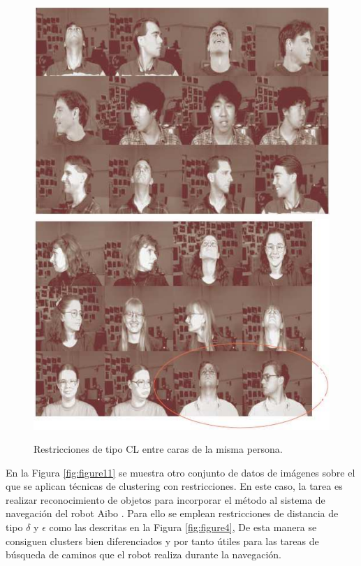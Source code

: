 \begin{figure}[bth]
	\myfloatalign
	{\includegraphics[width=.35\linewidth]{imagenes/c3/AnalisisImagenes/CarasDifOr1}} \quad
	{\includegraphics[width=.35\linewidth]{imagenes/c3/AnalisisImagenes/CarasDifOr2}}
	\caption[Restricciones de tipo \ac{CL} entre caras de la misma persona.]{Restricciones de tipo \ac{CL} entre caras de la misma persona.  \cite{Survey:2007}}\label{fig:figure10}
\end{figure}

En la Figura \ref{fig:figure11} se muestra otro conjunto de datos de imágenes sobre el que se aplican técnicas de clustering con restricciones. En este caso, la tarea es realizar reconocimiento de objetos para incorporar el método al sistema de navegación del robot Aibo \cite{DavidsonRavi:2005a}. Para ello se emplean restricciones de distancia de tipo $\delta$ y $\epsilon$ como las descritas en la Figura \ref{fig:figure4}, De esta manera se consiguen clusters bien diferenciados y por tanto útiles para las tareas de búsqueda de caminos que el robot realiza durante la navegación.

